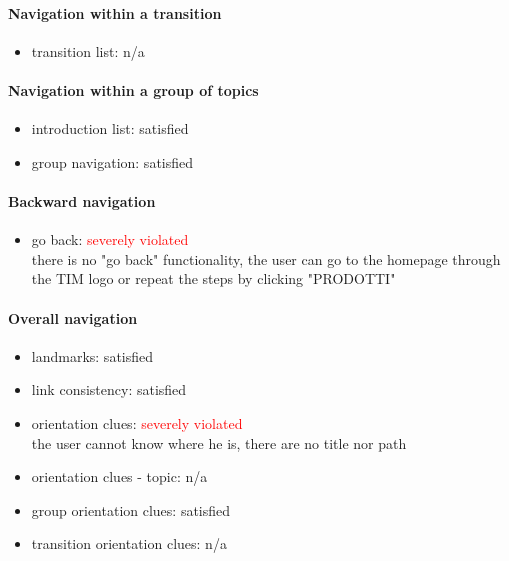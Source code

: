 \begin{enumerate}
	\paragraph*{Navigation within a transition}
	\begin{itemize}
		\item transition list: n/a
	\end{itemize}
	
	\paragraph*{Navigation within a group of topics}
	\begin{itemize}
		\item introduction list: satisfied
		\item group navigation: satisfied
	\end{itemize}
	
	\paragraph*{Backward navigation}
	\begin{itemize}
		\item go back: \textcolor{red}{severely violated}\\
		there is no "go back" functionality, the user can go to the homepage through the TIM logo or repeat the steps by clicking "PRODOTTI"
	\end{itemize}
	
	\paragraph*{Overall navigation}
	\begin{itemize}
		\item landmarks: satisfied
		\item link consistency: satisfied
		\item orientation clues: \textcolor{red}{severely violated}\\
		the user cannot know where he is, there are no title nor path
		\item orientation clues - topic: n/a
		\item group orientation clues: satisfied
		\item transition orientation clues: n/a
	\end{itemize}	
	

\end{enumerate}
